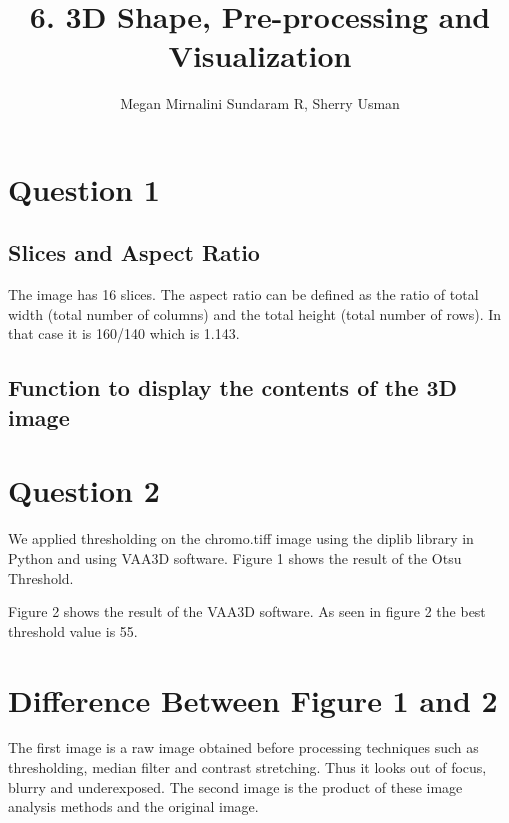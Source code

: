 \documentclass{article}
\title{6. 3D Shape, Pre-processing and Visualization}
\author{Megan Mirnalini Sundaram R, Sherry Usman}
\begin{document}
\maketitle



\section*{Question 1}
\subsection*{Slices and Aspect Ratio}
The image has 16 slices. The aspect ratio can be defined as the ratio of total width (total number of columns) and the total height (total number of rows). In that case it is 160/140 which is 1.143. 

\subsection*{Function to display the contents of the 3D image}

\section*{Question 2}
We applied thresholding on the chromo.tiff image using the diplib library in Python and using VAA3D software. Figure 1 shows the result of the Otsu Threshold. 

Figure 2 shows the result of the VAA3D software. As seen in figure 2 the best threshold value is 55. 

\section*{Difference Between Figure 1 and 2}

The first image is a raw image obtained before processing techniques such as thresholding, median filter and contrast stretching. Thus it looks out of focus, blurry and underexposed. The second image is the product of these image analysis methods and the original image. 





\end{document}
